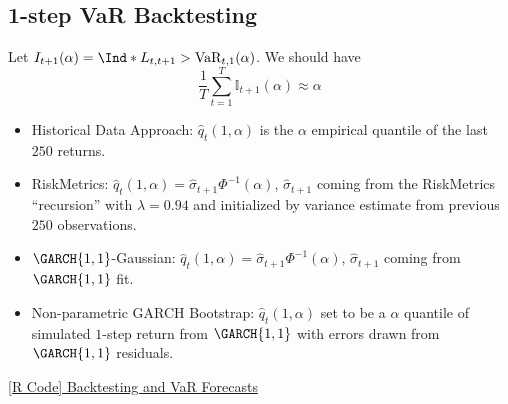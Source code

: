 \subsection*{1-step VaR Backtesting}
Let $ \mathbb{I}_{t+1}(\alpha)=\Ind*{L_{t,t+1}>\text{VaR}_{t,1}(\alpha)} $. We should
have
\[ \frac{1}{T} \sum_{t=1}^{T} \mathbb{I}_{t+1}(\alpha)\approx \alpha \]
\begin{itemize}
    \item Historical Data Approach: $ \hat{q}_t(1,\alpha) $ is the $ \alpha $
          empirical quantile of the last $ 250 $ returns.
    \item RiskMetrics: $ \hat{q}_t(1,\alpha)=\hat{\sigma}_{t+1}\Phi^{-1}(\alpha) $,
          $ \hat{\sigma}_{t+1} $ coming from the RiskMetrics ``recursion'' with $ \lambda=0.94 $
          and initialized by variance estimate from previous $ 250 $ observations.
    \item $ \GARCH{1,1} $-Gaussian: $ \hat{q}_{t}(1,\alpha)=\hat{\sigma}_{t+1}\Phi^{-1}(\alpha) $,
          $ \hat{\sigma}_{t+1} $ coming from $ \GARCH{1,1} $ fit.
    \item Non-parametric GARCH Bootstrap: $ \hat{q}_{t}(1,\alpha) $ set to be a
          $ \alpha $ quantile of simulated $ 1 $-step return from $ \GARCH{1,1} $
          with errors drawn from $ \GARCH{1,1} $ residuals.
\end{itemize}
\href{https://github.com/Hextical/university-notes/blob/master/year-3/semester-2/STAT 443/code/10.3 - Backtesting and VaR Forecasts.R}{[R Code] Backtesting and VaR Forecasts}
